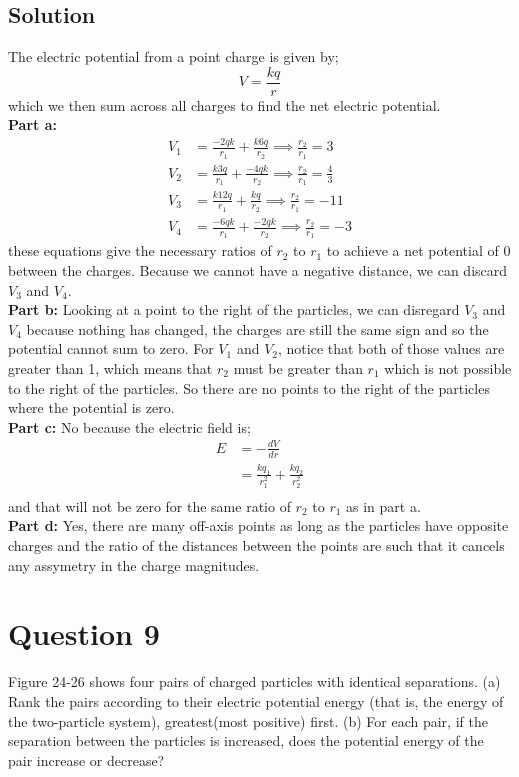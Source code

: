 \documentclass{article}
\begin{document}
\subsection*{Solution}
The electric potential from a point charge is given by;
\begin{equation}
    V = \frac{kq}{r}
\end{equation}
which we then sum across all charges to find the net electric potential.\\
\textbf{Part a:}
\begin{align*}
	V_1 &= \frac{-2qk}{r_1} + \frac{k6q}{r_2} \implies \frac{r_2}{r_1} = 3\\
	V_2 &= \frac{k3q}{r_1} + \frac{-4qk}{r_2} \implies \frac{r_2}{r_1} = \frac{4}{3}\\
	V_3 &= \frac{k12q}{r_1} + \frac{kq}{r_2} \implies \frac{r_2}{r_1} = -11\\
	V_4 &= \frac{-6qk}{r_1} + \frac{-2qk}{r_2} \implies \frac{r_2}{r_1} = -3
\end{align*}
these equations give the necessary ratios of $r_2$ to $r_1$ to achieve a net potential of 0 between the charges. Because we cannot have a negative distance, we can discard $V_3$ and $V_4$.\\[10pt]
\textbf{Part b:}
Looking at a point to the right of the particles, we can disregard $V_3$ and $V_4$ because nothing has changed, the charges are still the same sign and so the potential cannot sum to zero. For $V_1$ and $V_2$, notice that both of those values are greater than 1, which means that $r_2$ must be greater than $r_1$ which is not possible to the right of the particles. So there are no points to the right of the particles where the potential is zero.\\[10pt]
\textbf{Part c:}
No because the electric field is;
\begin{align*}
	E &= -\frac{dV}{dr} \\
	&= \frac{kq_1}{r_1^2} + \frac{kq_2}{r_2^2} \\
\end{align*}
and that will not be zero for the same ratio of $r_2$ to $r_1$ as in part a.\\[10pt]
\textbf{Part d:}
Yes, there are many off-axis points as long as the particles have opposite charges and the ratio of the distances between the points are such that it cancels any assymetry in the charge magnitudes.

\section*{Question 9}
Figure 24-26 shows four pairs of charged particles with identical separations. (a) Rank the pairs according to their electric potential energy (that is, the energy of the two-particle system), greatest(most positive) first. (b) For each pair, if the separation between the particles is increased, does the potential energy of the pair increase or decrease?
\end{document}
